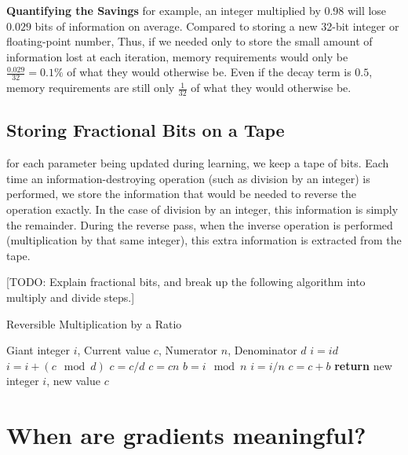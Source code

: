 \documentclass{article}
\begin{document}
\textbf{Quantifying the Savings}
for example, an integer multiplied by 0.98 will lose $0.029$ bits of information on average.
Compared to storing a new 32-bit integer or floating-point number, 
Thus, if we needed only to store the small amount of information lost at each iteration, memory requirements would only be ${\frac{0.029}{32} = 0.1\%}$ of what they would otherwise be.
Even if the decay term is $0.5$, memory requirements are still only $\frac{1}{32}$ of what they would otherwise be.

\subsection{Storing Fractional Bits on a Tape}

for each parameter being updated during learning, we keep a tape of bits.
Each time an information-destroying operation (such as division by an integer) is performed, we store the information that would be needed to reverse the operation exactly.  In the case of division by an integer, this information is simply the remainder.
During the reverse pass, when the inverse operation is performed (multiplication by that same integer), this extra information is extracted from the tape.

[TODO: Explain fractional bits, and break up the following algorithm into multiply and divide steps.]

\begin{algorithm}
   \caption{Reversible Multiplication by a Ratio}
   \label{alg:reversible-mult}
\begin{algorithmic}[1]
    Giant integer $i$, Current value $c$, Numerator $n$, Denominator $d$
   \State $i = id$ 
   \State $i = i + (c \mod d)$ 
   \State $c = c / d$ 
   \State $c = cn$ 
   \State $b = i \mod n$ 
   \State $i = i / n$ 
   \State $c = c + b$ 
   \State \textbf{return} new integer $i$, new value $c$
\end{algorithmic}
\end{algorithm}
%


\section{When are gradients meaningful?}
\end{document}
